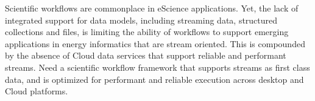 \documentclass[preprint,12pt]{article}
\begin{document}
Scientific workflows are commonplace in eScience applications. Yet,
the lack of integrated support for data models, including streaming
data, structured collections and files, is limiting the ability of
workflows to support emerging applications in energy informatics that
are stream oriented. This is compounded by the absence of Cloud data
services that support reliable and performant streams.  Need a
scientific workflow framework that supports streams as first class
data, and is optimized for performant and reliable execution across
desktop and Cloud platforms.








\end{document}
